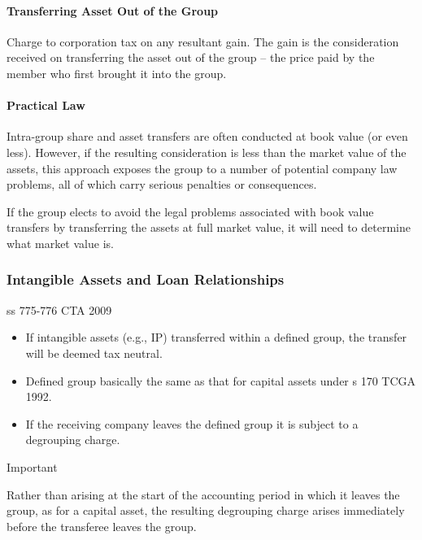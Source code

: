 \documentclass[
]{article}
\providecommand{\tightlist}{%
  \setlength{\itemsep}{0pt}\setlength{\parskip}{0pt}}
\newenvironment{env-3d391c14-39bb-45b0-8b12-18b66560aec4}
{
    \savenotes\tcolorbox[blanker,breakable,left=5pt,borderline west={2pt}{-4pt}{cyan}]
}
{
    \endtcolorbox\spewnotes
}
\begin{document}
\hypertarget{transferring-asset-out-of-the-group}{%
\paragraph{Transferring Asset Out of the
Group}\label{transferring-asset-out-of-the-group}}

Charge to corporation tax on any resultant gain. The gain is the
consideration received on transferring the asset out of the group -- the
price paid by the member who first brought it into the group.

\hypertarget{practical-law}{%
\paragraph{Practical Law}\label{practical-law}}

Intra-group share and asset transfers are often conducted at book value
(or even less). However, if the resulting consideration is less than the
market value of the assets, this approach exposes the group to a number
of potential company law problems, all of which carry serious penalties
or consequences.

If the group elects to avoid the legal problems associated with book
value transfers by transferring the assets at full market value, it will
need to determine what market value is.

\hypertarget{intangible-assets-and-loan-relationships}{%
\subsubsection{Intangible Assets and Loan
Relationships}\label{intangible-assets-and-loan-relationships}}

ss 775-776 CTA 2009

\begin{itemize}
\tightlist
\item
  If intangible assets (e.g., IP) transferred within a defined group,
  the transfer will be deemed tax neutral.
\item
  Defined group basically the same as that for capital assets under s
  170 TCGA 1992.
\item
  If the receiving company leaves the defined group it is subject to a
  degrouping charge.
\end{itemize}

\begin{env-3d391c14-39bb-45b0-8b12-18b66560aec4}

Important

Rather than arising at the start of the accounting period in which it
leaves the group, as for a capital asset, the resulting degrouping
charge arises immediately before the transferee leaves the group.

\end{env-3d391c14-39bb-45b0-8b12-18b66560aec4}
\end{document}

